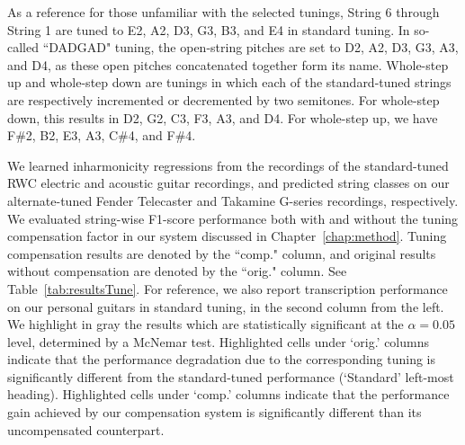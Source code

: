 \documentclass[12pt]{cmuthesis}
\begin{document}
As a reference for those unfamiliar with the selected tunings, String 6 through String 1 are tuned to E2, A2, D3, G3, B3, and E4 in standard tuning. In so-called ``DADGAD" tuning, the open-string pitches are set to D2, A2, D3, G3, A3, and D4, as these open pitches concatenated together form its name. Whole-step up and whole-step down are tunings in which each of the standard-tuned strings are respectively incremented or decremented by two semitones. For whole-step down, this results in D2, G2, C3, F3, A3, and D4. For whole-step up, we have F\#2, B2, E3, A3, C\#4, and F\#4.

We learned inharmonicity regressions from the recordings of the standard-tuned RWC electric and acoustic guitar recordings, and predicted string classes on our alternate-tuned Fender Telecaster and Takamine G-series recordings, respectively. We evaluated string-wise F1-score performance both with and without the tuning compensation factor in our system discussed in Chapter~\ref{chap:method}. Tuning compensation results are denoted by the ``comp." column, and original results without compensation are denoted by the ``orig." column. See Table~\ref{tab:resultsTune}. For reference, we also report transcription performance on our personal guitars in standard tuning, in the second column from the left. We highlight in gray the results which are statistically significant at the $\alpha = 0.05$ level, determined by a McNemar test. Highlighted cells under `orig.' columns indicate that the performance degradation due to the corresponding tuning is significantly different from the standard-tuned performance (`Standard' left-most heading). Highlighted cells under `comp.' columns indicate that the performance gain achieved by our compensation system is significantly different than its uncompensated counterpart.
\end{document}
